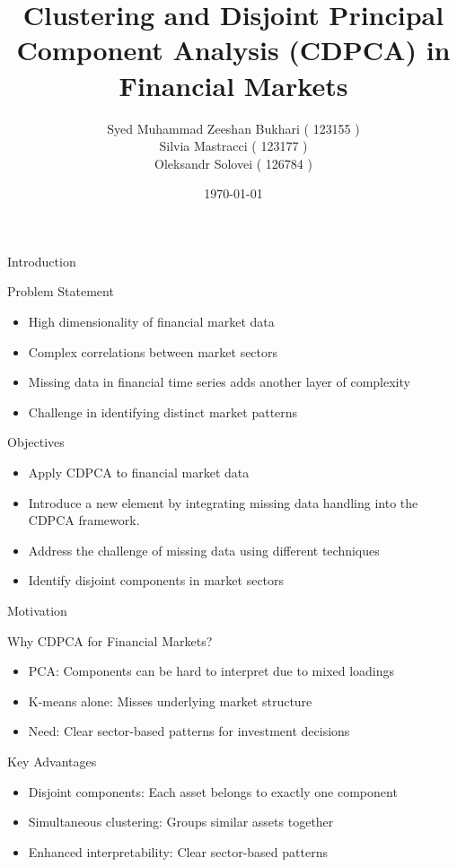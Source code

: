 \documentclass{beamer}
\title{Clustering and Disjoint Principal Component Analysis (CDPCA) in Financial Markets}
\author[123155/123177/126784]{Syed Muhammad Zeeshan Bukhari ( 123155 )\\
Silvia Mastracci ( 123177 )\\
Oleksandr Solovei ( 126784 )
}
\date{\today}
\begin{document}
\begin{frame}
    \titlepage
\end{frame}

\begin{frame}{Introduction}
    \begin{block}{Problem Statement}
        \begin{itemize}
            \item High dimensionality of financial market data
            \item Complex correlations between market sectors
            \item Missing data in financial time series adds another layer of complexity
            \item Challenge in identifying distinct market patterns
        \end{itemize}
    \end{block}

    \begin{block}{Objectives}
        \begin{itemize}
            \item Apply CDPCA to financial market data
            \item Introduce a new element by integrating missing data handling into the CDPCA framework.
            \item Address the challenge of missing data using different techniques
            \item Identify disjoint components in market sectors
        \end{itemize}
    \end{block}
\end{frame}

\begin{frame}{Motivation}
    \begin{block}{Why CDPCA for Financial Markets?}
        \begin{itemize}
            \item PCA: Components can be hard to interpret due to mixed loadings
            \item K-means alone: Misses underlying market structure
            \item Need: Clear sector-based patterns for investment decisions
        \end{itemize}
    \end{block}

    \begin{block}{Key Advantages}
        \begin{itemize}
            \item Disjoint components: Each asset belongs to exactly one component
            \item Simultaneous clustering: Groups similar assets together
            \item Enhanced interpretability: Clear sector-based patterns
        \end{itemize}
    \end{block}
\end{frame}
\end{document}
